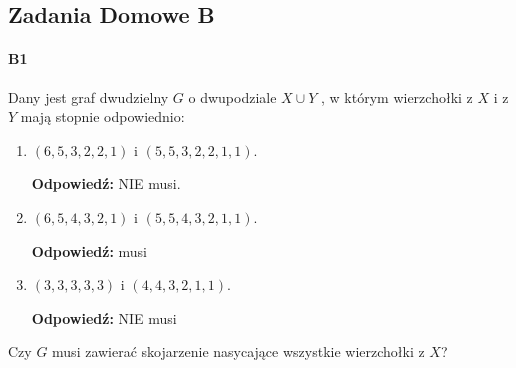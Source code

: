 \begin{enumerate}[label=\alph*)]

\end{enumerate}

\subsection{Zadania Domowe B}
\paragraph{B1} Dany jest graf dwudzielny $G$ o dwupodziale $X \cup Y$ , w którym wierzchołki z $X$ i z $Y$ mają stopnie odpowiednio:
\begin{enumerate}[label=\alph*)]
\item $(6, 5, 3, 2, 2, 1)$ i $(5, 5, 3, 2, 2, 1, 1)$.

\textbf{Odpowiedź: } NIE musi.
\item $(6, 5, 4, 3, 2, 1)$ i $(5, 5, 4, 3, 2, 1, 1)$.

\textbf{Odpowiedź: } musi
\item $(3, 3, 3, 3, 3)$ i $(4, 4, 3, 2, 1, 1)$.

\textbf{Odpowiedź: } NIE musi
\end{enumerate}
Czy $G$ musi zawierać skojarzenie nasycające wszystkie wierzchołki z $X$?

